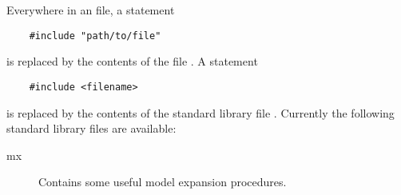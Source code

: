 
Everywhere in an \idp file, a statement 
\begin{lstlisting}
	#include "path/to/file"
\end{lstlisting}
is replaced by the contents of the file .
A statement
\begin{lstlisting}
	#include <filename>
\end{lstlisting}

is replaced by the contents of the standard library file .  Currently the following standard library files are available:
\begin{description}
\item[mx] Contains some useful model expansion procedures.
\end{description}

